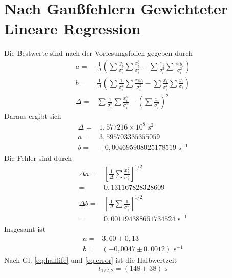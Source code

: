 \documentclass[prb,12pt]{revtex4-2}
\theoremstyle{definition}
\theoremstyle{definition}
\begin{document}
\section{Nach Gaußfehlern Gewichteter Lineare Regression}\label{sec:weightedreg}
Die Bestwerte sind nach der Vorlesungsfolien gegeben durch
\begin{align*}
	a=&\frac 1\Delta \left(\sum\frac{y_i}{\sigma_i^2}\sum\frac{x_i^2}{\sigma_i^2}-\sum\frac{x_i}{\sigma_i^2}\sum\frac{x_i y_i}{\sigma_i^2}\right)\\
	b=&\frac 1\Delta \left(\sum\frac{1}{\sigma_i^2}\sum\frac{x_i y_i}{\sigma_i^2}-\sum\frac{x_i}{\sigma_i^2}\sum\frac{y_i}{\sigma_i}\right)\\
	\Delta=&\sum\frac{1}{\sigma_i^2}\sum\frac{x_i^2}{\sigma_i^2}-\left(\sum\frac{x_i}{\sigma_i^2}\right)^2
\end{align*}
Daraus ergibt sich
\begin{align*}
	\Delta=&1,577216\times 10^8\text{ s}^2\\
	a=&3,595703335355059\\
	b=&-0,004695908025178519\text{ s}^{-1}
\end{align*}
Die Fehler sind durch
\begin{align}
	\Delta a=&\left[\frac 1\Delta \sum\frac{x_i^2}{\sigma_i^2}\right]^{1/2}\label{eq:gausspropa}\\
	=&0,131167828328609\nonumber\\
	\Delta b=&\left[\frac 1\Delta \sum\frac{1}{\sigma_i^2}\right]^{1/2}\label{eq:gausspropb}\\
	=& 0,001194388661734524\text{ s}^{-1}\nonumber
\end{align}
Insgesamt ist
\begin{align*}
	a=&3,60\pm 0,13\\
	b=&(-0,0047\pm 0,0012)\text{ s}^{-1}
\end{align*}
Nach Gl. \eqref{eq:halflife} und \eqref{eq:error} ist die Halbwertzeit
\[t_{1/2,2}=(148\pm 38)\text{ s}\]
\end{document}
